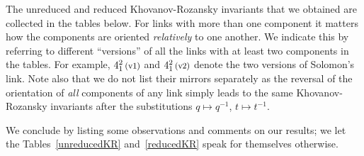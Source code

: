 \documentclass{compositio}
\theoremstyle{definition}
\numberwithin{equation}{section}
\begin{document}
The unreduced and reduced Khovanov-Rozansky invariants that we obtained are collected in the tables below. For links with more than one component it matters how the components are oriented \emph{relatively} to one another. We indicate this by referring to different ``versions'' of all the links with at least two components in the tables. For example, $4_{1}^2\,\text{{\footnotesize (v1)}}$ and $4_{1}^2\,\text{{\footnotesize (v2)}}$ denote the two versions of Solomon's link. Note also that we do not list their mirrors separately as the reversal of the orientation of \emph{all} components of any link simply leads to the same  Khovanov-Rozansky invariants after the substitutions $q\longmapsto q^{-1}$, $t\longmapsto t^{-1}$. 

We conclude by listing some observations and comments on our results; we let the Tables~\ref{unreducedKR} and~\ref{reducedKR} speak for themselves otherwise. 
\end{document}
